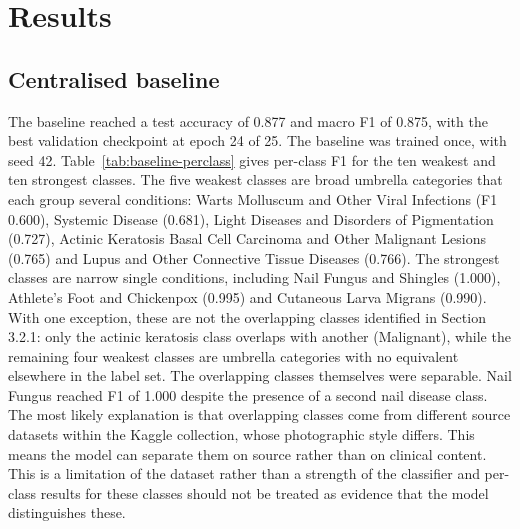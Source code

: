 \documentclass[12pt,openany,a4paper]{book}
\begin{document}
\section{Results}
\subsection{Centralised baseline}
The baseline reached a test accuracy of 0.877 and macro F1 of 0.875, with the best validation checkpoint at epoch 24 of 25. The baseline was trained once, with seed 42. Table~\ref{tab:baseline-perclass} gives per-class F1 for the ten weakest and ten strongest classes. The five weakest classes are broad umbrella categories that each group several conditions: Warts Molluscum and Other Viral Infections (F1 0.600), Systemic Disease (0.681), Light Diseases and Disorders of Pigmentation (0.727), Actinic Keratosis Basal Cell Carcinoma and Other Malignant Lesions (0.765) and Lupus and Other Connective Tissue Diseases (0.766). The strongest classes are narrow single conditions, including Nail Fungus and Shingles (1.000), Athlete's Foot and Chickenpox (0.995) and Cutaneous Larva Migrans (0.990). With one exception, these are not the overlapping classes identified in Section 3.2.1: only the actinic keratosis class overlaps with another (Malignant), while the remaining four weakest classes are umbrella categories with no equivalent elsewhere in the label set. The overlapping classes themselves were separable. Nail Fungus reached F1 of 1.000 despite the presence of a second nail disease class. The most likely explanation is that overlapping classes come from different source datasets within the Kaggle collection, whose photographic style differs. This means the model can separate them on source rather than on clinical content. This is a limitation of the dataset rather than a strength of the classifier and per-class results for these classes should not be treated as evidence that the model distinguishes these.

\begin{table}[H]
  \centering
  \caption{Per-class test F1 for the centralised baseline, ten lowest and ten highest, sorted ascending. Every class has 100 test images.}
  \label{tab:baseline-perclass}
  \small
  
\end{table}
\end{document}
